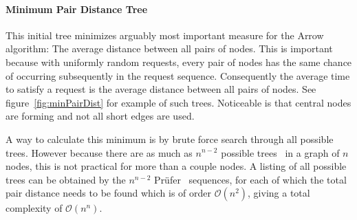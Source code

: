 \documentclass[a4paper, oneside]{discothesis}
\begin{document}
\paragraph{Minimum Pair Distance Tree}

This initial tree minimizes arguably most important measure for the Arrow algorithm: The average distance between all pairs of nodes. This is important because with uniformly random requests, every pair of nodes has the same chance of occurring subsequently in the request sequence. Consequently the average time to satisfy a request is the average distance between all pairs of nodes. See figure~\ref{fig:minPairDist} for example of such trees. Noticeable is that central nodes are forming and not all short edges are used.

A way to calculate this minimum is by brute force search through all possible trees. However because there are as much as $n^{n-2}$ possible trees~\cite{Borchardt} in a graph of $n$ nodes, this is not practical for more than a couple nodes. A listing of all possible trees can be obtained by the $n^{n-2}$ Prüfer~\cite{Prufer} sequences, for each of which the total pair distance needs to be found which is of order $\mathcal{O}(n^2)$, giving a total complexity of $\mathcal{O}(n^n)$.
\end{document}
